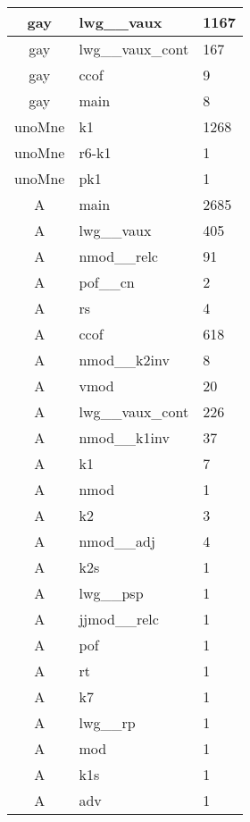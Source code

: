 \documentclass[a4 paper]{article}
\begin{document}
\begin{longtable}{cp{}p{}}
gay & lwg\_\_vaux & 1167\\ \midrule gay & lwg\_\_vaux\_cont & 167\\ \midrule gay & ccof & 9\\ \midrule gay & main & 8\\ \midrule 
unoMne & k1 & 1268\\ \midrule unoMne & r6-k1 & 1\\ \midrule unoMne & pk1 & 1\\ \midrule 
A & main & 2685\\ \midrule A & lwg\_\_vaux & 405\\ \midrule A & nmod\_\_relc & 91\\ \midrule A & pof\_\_cn & 2\\ \midrule A & rs & 4\\ \midrule A & ccof & 618\\ \midrule A & nmod\_\_k2inv & 8\\ \midrule A & vmod & 20\\ \midrule A & lwg\_\_vaux\_cont & 226\\ \midrule A & nmod\_\_k1inv & 37\\ \midrule A & k1 & 7\\ \midrule A & nmod & 1\\ \midrule A & k2 & 3\\ \midrule A & nmod\_\_adj & 4\\ \midrule A & k2s & 1\\ \midrule A & lwg\_\_psp & 1\\ \midrule A & jjmod\_\_relc & 1\\ \midrule A & pof & 1\\ \midrule A & rt & 1\\ \midrule A & k7 & 1\\ \midrule A & lwg\_\_rp & 1\\ \midrule A & mod & 1\\ \midrule A & k1s & 1\\ \midrule A & adv & 1\\ \midrule 

\end{longtable}
\end{document}
